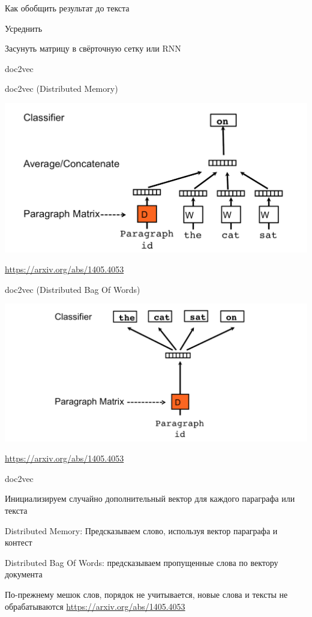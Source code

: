 \documentclass[notes,12pt, aspectratio=169]{beamer}
\newenvironment{wideitemize}{\itemize\addtolength{\itemsep}{10pt}}{\enditemize}
\begin{document}
\begin{frame}{Как обобщить результат до текста}
	\begin{wideitemize} 
		\item  Усреднить
		\item  Засунуть матрицу в свёрточную сетку или RNN
	    \item   doc2vec 
	\end{wideitemize} 
\end{frame} 


\begin{frame}{doc2vec (Distributed Memory)}
	\begin{center}
		\includegraphics[width=.75\linewidth]{doc2vec1.png}
	\end{center}
	\vfill
\footnotesize  {\color{blue} \url{https://arxiv.org/abs/1405.4053}}
\end{frame} 


\begin{frame}{doc2vec (Distributed Bag Of Words)}
	\begin{center}
		\includegraphics[width=.8\linewidth]{doc2vec2.png}
	\end{center}
	\vfill
\footnotesize  {\color{blue} \url{https://arxiv.org/abs/1405.4053}}
\end{frame} 


\begin{frame}{doc2vec}
	\begin{wideitemize} 
		\item  Инициализируем случайно дополнительный вектор для каждого параграфа или текста
		\item \alert{Distributed Memory:}  Предсказываем слово, используя вектор параграфа и контест
		\item  \alert{Distributed Bag Of Words:} предсказываем пропущенные слова по вектору документа
		\item  По-прежнему мешок слов, порядок не учитывается, новые слова и тексты не обрабатываются
	\end{wideitemize} 
	\vfill
\footnotesize  {\color{blue} \url{https://arxiv.org/abs/1405.4053}}
\end{frame} 
\end{document}
